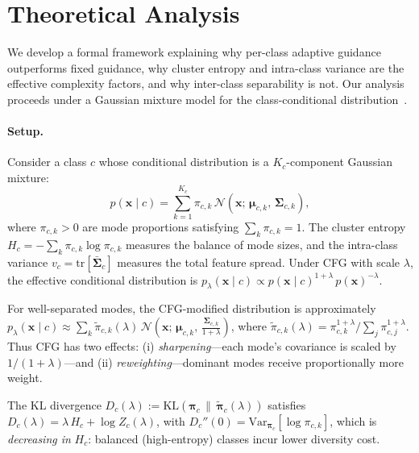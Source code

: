 \section{Theoretical Analysis}
\label{sec:theory}

We develop a formal framework explaining why per-class adaptive guidance outperforms fixed guidance, why cluster entropy and intra-class variance are the effective complexity factors, and why inter-class separability is not. Our analysis proceeds under a Gaussian mixture model for the class-conditional distribution~\cite{ho2022classifierfree, peebles2022scalable}.

\paragraph{Setup.}
Consider a class $c$ whose conditional distribution is a $K_c$-component Gaussian mixture:
\begin{equation}
p(\mathbf{x} \mid c) = \sum_{k=1}^{K_c} \pi_{c,k}\,\mathcal{N}(\mathbf{x};\,\boldsymbol{\mu}_{c,k},\,\boldsymbol{\Sigma}_{c,k}),
\label{eq:gmm}
\end{equation}
where $\pi_{c,k} > 0$ are mode proportions satisfying $\sum_k \pi_{c,k} = 1$. The cluster entropy $H_c = -\sum_k \pi_{c,k}\log\pi_{c,k}$ measures the balance of mode sizes, and the intra-class variance $v_c = \mathrm{tr}[\bar{\boldsymbol{\Sigma}}_c]$ measures the total feature spread. Under CFG with scale $\lambda$, the effective conditional distribution is $p_\lambda(\mathbf{x}\mid c) \propto p(\mathbf{x}\mid c)^{1+\lambda}\,p(\mathbf{x})^{-\lambda}$.

\begin{lemma}
\label{lem:cfg-modes}
For well-separated modes, the CFG-modified distribution is approximately $p_\lambda(\mathbf{x}\mid c) \approx \sum_{k} \tilde{\pi}_{c,k}(\lambda)\,\mathcal{N}\!\left(\mathbf{x};\,\boldsymbol{\mu}_{c,k},\,\tfrac{\boldsymbol{\Sigma}_{c,k}}{1+\lambda}\right)$, where $\tilde{\pi}_{c,k}(\lambda) = \pi_{c,k}^{1+\lambda}\big/\sum_j \pi_{c,j}^{1+\lambda}$. Thus CFG has two effects: (i) \emph{sharpening}---each mode's covariance is scaled by $1/(1+\lambda)$---and (ii) \emph{reweighting}---dominant modes receive proportionally more weight.
\end{lemma}

\begin{proposition}
\label{prop:div-cost}
The KL divergence $D_c(\lambda) := \mathrm{KL}\!\left(\boldsymbol{\pi}_c \,\|\, \tilde{\boldsymbol{\pi}}_c(\lambda)\right)$ satisfies $D_c(\lambda) = \lambda\,H_c + \log Z_c(\lambda)$, with $D_c''(0) = \mathrm{Var}_{\boldsymbol{\pi}_c}[\log\pi_{c,k}]$, which is \emph{decreasing in} $H_c$: balanced (high-entropy) classes incur lower diversity cost.
\end{proposition}

